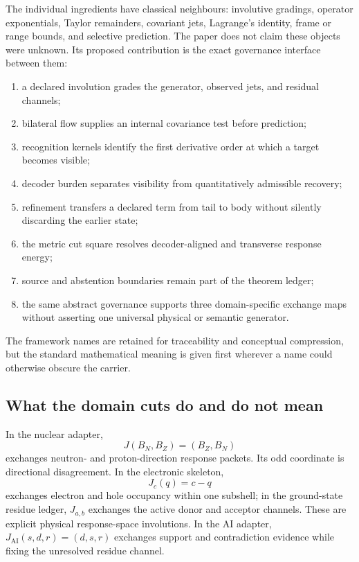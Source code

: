 The individual ingredients have classical neighbours: involutive gradings, operator exponentials, Taylor remainders, covariant jets, Lagrange's identity, frame or range bounds, and selective prediction. The paper does not claim these objects were unknown. Its proposed contribution is the exact governance interface between them:
\begin{enumerate}[label=(\arabic*)]
\item a declared involution grades the generator, observed jets, and residual channels;
\item bilateral flow supplies an internal covariance test before prediction;
\item recognition kernels identify the first derivative order at which a target becomes visible;
\item decoder burden separates visibility from quantitatively admissible recovery;
\item refinement transfers a declared term from tail to body without silently discarding the earlier state;
\item the metric cut square resolves decoder-aligned and transverse response energy;
\item source and abstention boundaries remain part of the theorem ledger;
\item the same abstract governance supports three domain-specific exchange maps without asserting one universal physical or semantic generator.
\end{enumerate}

The framework names are retained for traceability and conceptual compression, but the standard mathematical meaning is given first wherever a name could otherwise obscure the carrier.

\subsection{What the domain cuts do and do not mean}

In the nuclear adapter,
\[
 J(B_N,B_Z)=(B_Z,B_N)
\]
exchanges neutron- and proton-direction response packets. Its odd coordinate is directional disagreement. In the electronic skeleton,
\[
 J_c(q)=c-q
\]
exchanges electron and hole occupancy within one subshell; in the ground-state residue ledger, $J_{a,b}$ exchanges the active donor and acceptor channels. These are explicit physical response-space involutions. In the AI adapter, $J_{\mathrm{AI}}(s,d,r)=(d,s,r)$ exchanges support and contradiction evidence while fixing the unresolved residue channel.


